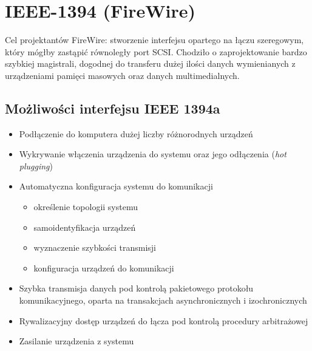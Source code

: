 \newpage
\section{IEEE-1394 (FireWire)}
Cel projektantów FireWire: stworzenie interfejsu opartego na łączu szeregowym, który mógłby zastąpić równoległy port SCSI. Chodziło o zaprojektowanie bardzo szybkiej magistrali, dogodnej do transferu dużej ilości danych wymienianych z urządzeniami pamięci masowych oraz danych multimedialnych.

\subsection{Możliwości interfejsu IEEE 1394a}
\begin{itemize}
	\item Podłączenie do komputera dużej liczby różnorodnych urządzeń
	\item Wykrywanie włączenia urządzenia do systemu oraz jego odłączenia (\emph{hot plugging})
	\item Automatyczna konfiguracja systemu do komunikacji
	\begin{itemize}
		\item określenie topologii systemu
		\item samoidentyfikacja urządzeń
		\item wyznaczenie szybkości transmisji
		\item konfiguracja urządzeń do komunikacji
	\end{itemize}
	\item Szybka transmisja danych pod kontrolą pakietowego protokołu komunikacyjnego, oparta na transakcjach asynchronicznych i izochronicznych
	\item Rywalizacyjny dostęp urządzeń do łącza pod kontrolą procedury arbitrażowej
	\item Zasilanie urządzenia z systemu
\end{itemize}

